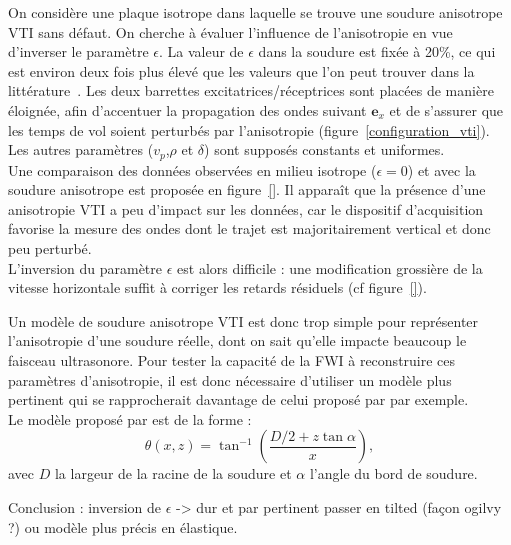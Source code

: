 On considère une plaque isotrope dans laquelle se trouve une soudure anisotrope VTI sans défaut. On cherche à évaluer l'influence de l'anisotropie en vue d'inverser le paramètre $\epsilon$. La valeur de $\epsilon$ dans la soudure est fixée à 20\%, ce qui est environ deux fois plus élevé que les valeurs que l'on peut trouver dans la littérature~\citep{chassignole}. Les deux barrettes excitatrices/réceptrices sont placées de manière éloignée, afin d'accentuer la propagation des ondes suivant $\bm{e}_{x}$ et de s'assurer que les temps de vol soient perturbés par l'anisotropie (figure~\ref{configuration_vti}).\\
Les autres paramètres ($v_{p}$,$\rho$ et $\delta$) sont supposés constants et uniformes.\\

Une comparaison des données observées en milieu isotrope ($\epsilon = 0$) et avec la soudure anisotrope est proposée en figure~\ref{}. Il apparaît que la présence d'une anisotropie VTI a peu d'impact sur les données, car le dispositif d'acquisition favorise la mesure des ondes dont le trajet est majoritairement vertical et donc peu perturbé.\\
 L'inversion du paramètre $\epsilon$ est alors difficile : une modification grossière de la vitesse horizontale suffit à corriger les retards résiduels (cf figure~\ref{}).
 
 
Un modèle de soudure anisotrope VTI est donc trop simple pour représenter l'anisotropie d'une soudure réelle, dont on sait qu'elle impacte beaucoup le faisceau ultrasonore. Pour tester la capacité de la FWI à reconstruire ces paramètres d'anisotropie, il est donc nécessaire d'utiliser un modèle plus pertinent qui se rapprocherait davantage de celui proposé par \cite{ogilvy} par exemple.\\

Le modèle proposé par \cite{ogilvy} est de la forme : 
\begin{equation}
	\theta(x,z) = \tan^{-1}\left( \frac{D/2 + z\tan\alpha}{x} \right),
\end{equation}
avec $D$ la largeur de la racine de la soudure et $\alpha$  l'angle du bord de soudure.

 Conclusion : inversion de $\epsilon$ -> dur et par pertinent
passer en tilted (façon ogilvy ?) ou modèle plus précis en élastique.






